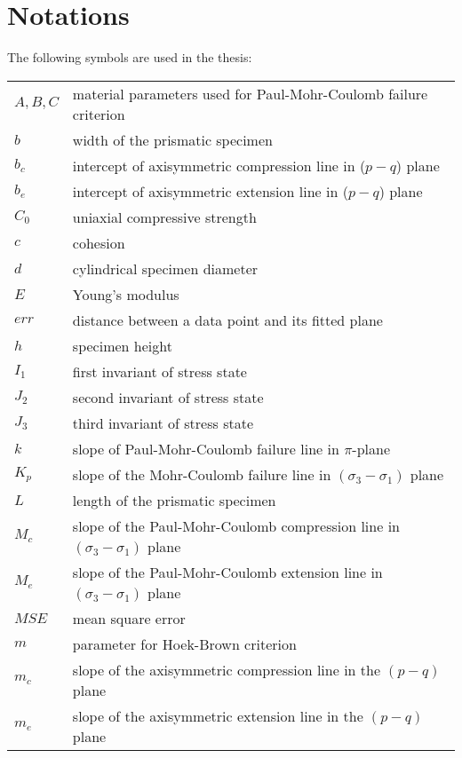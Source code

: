 \appendix
\chapter{Notations}\label{App:A}
The following symbols are used in the thesis:
\begin{table}[h]
    \begin{tabular}{ll}
        $A, B, C$ & material parameters used for Paul-Mohr-Coulomb failure criterion \\
        $b$ & width of the prismatic specimen  \\
        $b_c$ & intercept of axisymmetric compression line in ($p-q$) plane \\
        $b_e$ & intercept of axisymmetric extension line in ($p-q$) plane \\
        $C_0$ & uniaxial compressive strength \\
        $c$ & cohesion \\
        $d$ & cylindrical specimen diameter \\
        $E$ & Young's modulus \\
        $err$ & distance between a data point and its fitted plane \\
        $h$ & specimen height \\
        $I_1$ & first invariant of stress state \\
        $J_2$ & second invariant of stress state \\
        $J_3$ & third invariant of stress state \\
        $k$ & slope of Paul-Mohr-Coulomb failure line in $\pi$-plane \\
        $K_p$ & slope of the Mohr-Coulomb failure line in $(\sigma_3-\sigma_1)$ plane \\
        $L$ & length of the prismatic specimen \\ 
        $M_c$ & slope of the Paul-Mohr-Coulomb compression line in $(\sigma_3-\sigma_1)$ plane \\
        $M_e$ & slope of the Paul-Mohr-Coulomb extension line in $(\sigma_3-\sigma_1)$ plane \\
        $MSE$ & mean square error \\
        $m$ & parameter for Hoek-Brown criterion \\
        $m_c$ & slope of the axisymmetric compression line in the $(p-q)$ plane\\
        $m_e$ & slope of the axisymmetric extension line in the $(p-q)$ plane\\

\end{tabular}
\end{table}
